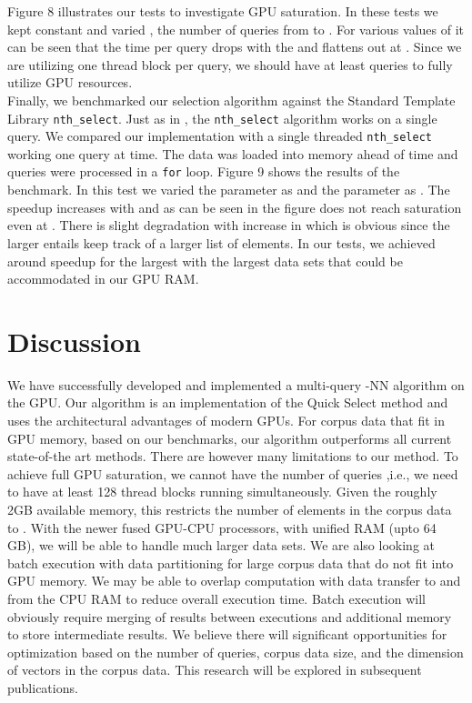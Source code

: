\documentclass[10pt]{article}
\begin{document}
Figure 8 illustrates our tests to investigate GPU saturation. In these tests we kept  constant and varied , the number of queries from  to . For various values of  it can be seen that the time per query drops with the  and flattens out at . Since we are utilizing one thread block per query, we should have at least  queries to fully utilize GPU resources.  \\

Finally, we benchmarked our selection algorithm against the Standard Template Library \texttt{nth\_select}. Just as in \cite{Alabi:2012}, the \texttt{nth\_select} algorithm works on a single query. We compared our implementation with a single threaded \texttt{nth\_select} working one query at time. The data was loaded into memory ahead of time and queries were processed in a \texttt{for} loop.  Figure 9 shows the results of the benchmark. In this test we varied the parameter  as  and the parameter  as  .  The speedup increases with  and as can be seen in the figure does not reach saturation even at . There is slight degradation with increase in  which is obvious since the larger  entails keep track of a larger list of elements. In our tests, we achieved around  speedup for the largest  with the largest data sets that could be accommodated in our GPU RAM. 

\section*{Discussion} We have successfully developed and implemented a multi-query -NN algorithm on the GPU. Our algorithm is an implementation of the Quick Select method and uses the architectural advantages of modern GPUs. For corpus data that fit in GPU memory, based on our benchmarks, our algorithm outperforms all current state-of-the art methods. There are however many limitations to our method. To achieve full GPU saturation, we cannot have the number of queries ,i.e., we need to have at least 128 thread blocks running simultaneously. Given the roughly 2GB available memory, this restricts the number of elements in the corpus data to .  With the newer fused GPU-CPU processors, with unified RAM (upto 64 GB), we will be able to handle much larger data sets.  We are also looking at batch execution with data partitioning for large corpus data that do not fit into GPU memory. We may be able to overlap computation with data transfer to and from the CPU RAM to reduce overall execution time.  Batch execution will obviously require merging of results between executions and additional memory to store intermediate results. We believe there will significant opportunities for optimization based on the number of queries, corpus data size, and the dimension of vectors in the corpus data. This research will be explored in subsequent publications.
\end{document}
